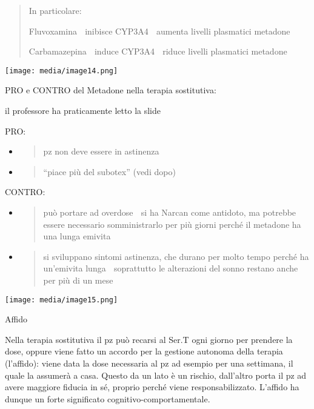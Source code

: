 \documentclass[]{article}
\begin{document}
\begin{quote}
In particolare:

Fluvoxamina  inibisce CYP3A4  aumenta livelli plasmatici metadone

Carbamazepina  induce CYP3A4  riduce livelli plasmatici metadone
\end{quote}

\texttt{[image: media/image14.png]}

PRO e CONTRO del Metadone nella terapia sostitutiva:

il professore ha praticamente letto la slide

PRO:

\begin{itemize}
\item
  \begin{quote}
  pz non deve essere in astinenza
  \end{quote}
\item
  \begin{quote}
  ``piace più del subotex'' (vedi dopo)
  \end{quote}
\end{itemize}

CONTRO:

\begin{itemize}
\item
  \begin{quote}
  può portare ad overdose  si ha Narcan come antidoto, ma potrebbe
  essere necessario somministrarlo per più giorni perché il metadone ha
  una lunga emivita
  \end{quote}
\item
  \begin{quote}
  si sviluppano sintomi astinenza, che durano per molto tempo perché ha
  un'emivita lunga  soprattutto le alterazioni del sonno restano anche
  per più di un mese
  \end{quote}
\end{itemize}

\texttt{[image: media/image15.png]}

Affido

Nella terapia sostitutiva il pz può recarsi al Ser.T ogni giorno per
prendere la dose, oppure viene fatto un accordo per la gestione autonoma
della terapia (l'affido): viene data la dose necessaria al pz ad esempio
per una settimana, il quale la assumerà a casa. Questo da un lato è un
rischio, dall'altro porta il pz ad avere maggiore fiducia in sé, proprio
perché viene responsabilizzato. L'affido ha dunque un forte significato
cognitivo-comportamentale.
\end{document}
